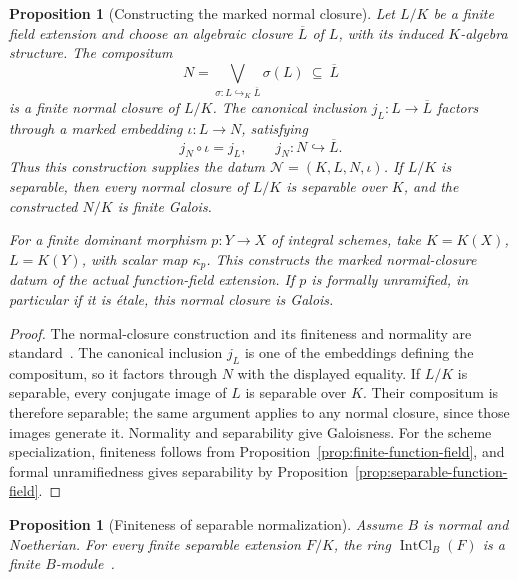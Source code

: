 \documentclass[11pt]{article}
\newtheorem{proposition}[theorem]{Proposition}
\theoremstyle{definition}
\theoremstyle{remark}
\begin{document}
\begin{proposition}[Constructing the marked normal closure]
\label{prop:constructed-normal-closure}
Let \(L/K\) be a finite field extension and choose an algebraic
closure \(\overline L\) of \(L\), with its induced \(K\)-algebra
structure. The compositum
\[
  N=\bigvee_{\sigma:L\hookrightarrow_K\overline L}\sigma(L)
    \ \subseteq\ \overline L
\]
is a finite normal closure of \(L/K\). The canonical inclusion
\(j_L:L\to\overline L\) factors through a marked embedding
\(\iota:L\to N\), satisfying
\[
  j_N\circ\iota=j_L,
  \qquad j_N:N\hookrightarrow\overline L.
\]
Thus this construction supplies the datum
\(\mathcal N=(K,L,N,\iota)\).
If \(L/K\) is separable, then every normal closure of \(L/K\)
is separable over \(K\), and the constructed \(N/K\) is finite
Galois.

For a finite dominant morphism \(p:Y\to X\) of integral schemes,
take \(K=K(X)\), \(L=K(Y)\), with scalar map \(\kappa_p\).
This constructs the marked normal-closure datum of the actual
function-field extension. If \(p\) is formally unramified, in
particular if it is \'{e}tale, this normal closure is Galois.
\end{proposition}

\begin{proof}
The normal-closure construction and its finiteness and normality are
standard~\cite{StacksNormalClosureExistence,StacksFiniteNormalClosure}.
The canonical inclusion \(j_L\) is one of the embeddings defining
the compositum, so it factors through \(N\) with the displayed
equality. If \(L/K\) is separable, every conjugate image of \(L\)
is separable over \(K\). Their compositum is therefore separable;
the same argument applies to any normal closure, since those images
generate it. Normality and separability give Galoisness.
For the scheme specialization, finiteness follows from
Proposition~\ref{prop:finite-function-field}, and formal unramifiedness
gives separability by Proposition~\ref{prop:separable-function-field}.
\end{proof}

\begin{proposition}[Finiteness of separable normalization]
\label{prop:finite-separable-normalization}
Assume \(B\) is normal and Noetherian. For every finite separable
extension \(F/K\), the ring \(\operatorname{IntCl}_B(F)\) is a
finite \(B\)-module~\cite{StacksFiniteSeparableNormalization}.
\end{proposition}
\end{document}
